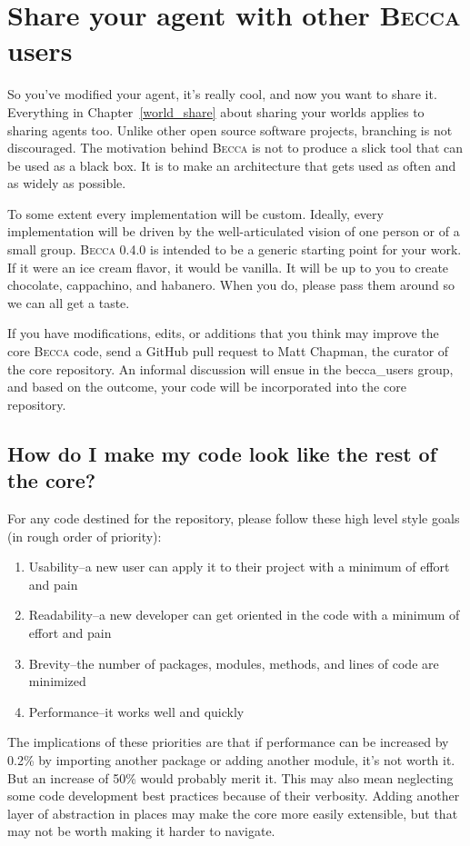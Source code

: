 \chapter{Share your agent with other \textsc{Becca} users}

So you've modified your agent, it's really cool, and now you want to share it. Everything in Chapter~\ref{world_share} about sharing your worlds applies to sharing agents too. Unlike other open source software projects, branching is not discouraged. The motivation behind \textsc{Becca} is not to produce a slick tool that can be used as a black box. It is to make an architecture that gets used as often and as widely as possible. 

To some extent every implementation will be custom. Ideally, every implementation will be driven by the well-articulated vision of one person or of a small group. \textsc{Becca} 0.4.0 is intended to be a generic starting point for your work. If it were an ice cream flavor, it would be vanilla. It will be up to you to create chocolate, cappachino, and habanero. When you do, please pass them around so we can all get a taste.

If you have modifications, edits, or additions that you think may improve the core \textsc{Becca} code, send a GitHub pull request to Matt Chapman, the curator of the core repository. An informal discussion will ensue in the becca\_users group, and based on the outcome, your code will be incorporated into the core repository.

\section{How do I make my code look like the rest of the core?}
For any code destined for the repository, please follow these high level style goals (in rough order of priority):
\begin{enumerate}
\item Usability--a new user can apply it to their project with a minimum
of effort and pain
\item Readability--a new developer can get oriented in the code with a
minimum of effort and pain
\item Brevity--the number of packages, modules, methods, and lines of
code are minimized
\item Performance--it works well and quickly
\end{enumerate}

The implications of these priorities are that if performance can be increased by 0.2\% by importing another
package or adding another module, it's not worth it. But an
increase of 50\% would probably merit it. This may also mean neglecting
some code development best practices because of their verbosity.
Adding another layer of abstraction in places may make the core more
easily extensible, but that may not be worth making it harder to
navigate.

